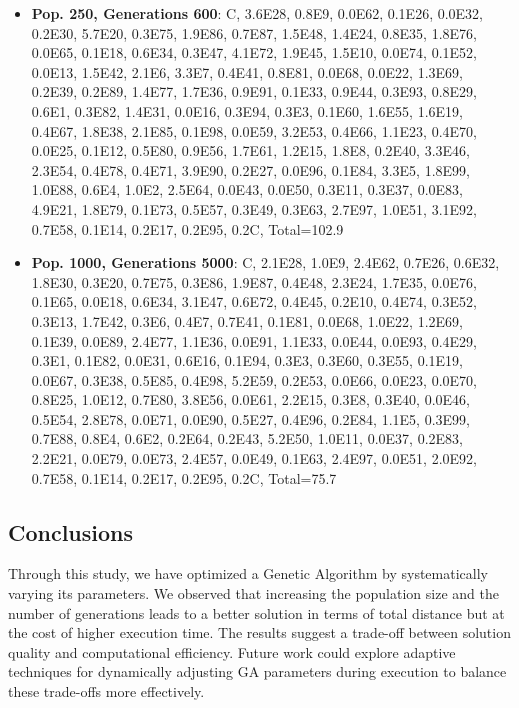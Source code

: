 \begin{itemize}
    \item \textbf{Pop. 250, Generations 600}: C, 3.6E28, 0.8E9, 0.0E62, 0.1E26, 0.0E32, 0.2E30, 5.7E20, 0.3E75, 1.9E86, 0.7E87, 1.5E48, 1.4E24, 0.8E35, 1.8E76, 0.0E65, 0.1E18, 0.6E34, 0.3E47, 4.1E72, 1.9E45, 1.5E10, 0.0E74, 0.1E52, 0.0E13, 1.5E42, 2.1E6, 3.3E7, 0.4E41, 0.8E81, 0.0E68, 0.0E22, 1.3E69, 0.2E39, 0.2E89, 1.4E77, 1.7E36, 0.9E91, 0.1E33, 0.9E44, 0.3E93, 0.8E29, 0.6E1, 0.3E82, 1.4E31, 0.0E16, 0.3E94, 0.3E3, 0.1E60, 1.6E55, 1.6E19, 0.4E67, 1.8E38, 2.1E85, 0.1E98, 0.0E59, 3.2E53, 0.4E66, 1.1E23, 0.4E70, 0.0E25, 0.1E12, 0.5E80, 0.9E56, 1.7E61, 1.2E15, 1.8E8, 0.2E40, 3.3E46, 2.3E54, 0.4E78, 0.4E71, 3.9E90, 0.2E27, 0.0E96, 0.1E84, 3.3E5, 1.8E99, 1.0E88, 0.6E4, 1.0E2, 2.5E64, 0.0E43, 0.0E50, 0.3E11, 0.3E37, 0.0E83, 4.9E21, 1.8E79, 0.1E73, 0.5E57, 0.3E49, 0.3E63, 2.7E97, 1.0E51, 3.1E92, 0.7E58, 0.1E14, 0.2E17, 0.2E95, 0.2C, Total=102.9
    \item \textbf{Pop. 1000, Generations 5000}: C, 2.1E28, 1.0E9, 2.4E62, 0.7E26, 0.6E32, 1.8E30, 0.3E20, 0.7E75, 0.3E86, 1.9E87, 0.4E48, 2.3E24, 1.7E35, 0.0E76, 0.1E65, 0.0E18, 0.6E34, 3.1E47, 0.6E72, 0.4E45, 0.2E10, 0.4E74, 0.3E52, 0.3E13, 1.7E42, 0.3E6, 0.4E7, 0.7E41, 0.1E81, 0.0E68, 1.0E22, 1.2E69, 0.1E39, 0.0E89, 2.4E77, 1.1E36, 0.0E91, 1.1E33, 0.0E44, 0.0E93, 0.4E29, 0.3E1, 0.1E82, 0.0E31, 0.6E16, 0.1E94, 0.3E3, 0.3E60, 0.3E55, 0.1E19, 0.0E67, 0.3E38, 0.5E85, 0.4E98, 5.2E59, 0.2E53, 0.0E66, 0.0E23, 0.0E70, 0.8E25, 1.0E12, 0.7E80, 3.8E56, 0.0E61, 2.2E15, 0.3E8, 0.3E40, 0.0E46, 0.5E54, 2.8E78, 0.0E71, 0.0E90, 0.5E27, 0.4E96, 0.2E84, 1.1E5, 0.3E99, 0.7E88, 0.8E4, 0.6E2, 0.2E64, 0.2E43, 5.2E50, 1.0E11, 0.0E37, 0.2E83, 2.2E21, 0.0E79, 0.0E73, 2.4E57, 0.0E49, 0.1E63, 2.4E97, 0.0E51, 2.0E92, 0.7E58, 0.1E14, 0.2E17, 0.2E95, 0.2C, Total=75.7
\end{itemize}

\subsection{Conclusions}

Through this study, we have optimized a Genetic Algorithm by systematically varying its parameters.
We observed that increasing the population size and the number of generations leads to a better solution in terms of total distance but at the cost of higher execution time.
The results suggest a trade-off between solution quality and computational efficiency.
Future work could explore adaptive techniques for dynamically adjusting GA parameters during execution to balance these trade-offs more effectively.


